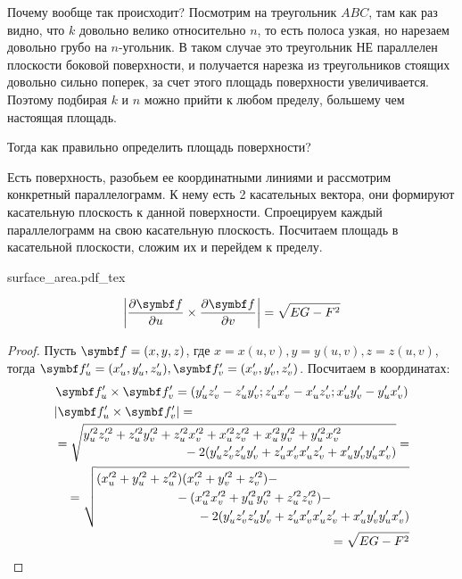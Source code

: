 \documentclass[main]{subfiles}
\begin{document}
\begin{example}
    Почему вообще так происходит?
    Посмотрим на треугольник $ABC$, там как раз видно, что $k$ довольно велико относительно $n$,
    то есть полоса узкая, но нарезаем довольно грубо на $n$-угольник.
    В таком случае это треугольник НЕ параллелен плоскости боковой поверхности,
    и получается нарезка из треугольников стоящих довольно сильно поперек, за счет этого площадь поверхности увеличивается.
    Поэтому подбирая $k$ и $n$ можно прийти к любом пределу, большему чем настоящая площадь.
\end{example}

Тогда как правильно определить площадь поверхности?

\begin{definition}
    Есть поверхность, разобьем ее координатными линиями и рассмотрим конкретный параллелограмм.
    К нему есть 2 касательных вектора, они формируют касательную плоскость к данной поверхности.
    Спроецируем каждый параллелограмм на свою касательную плоскость.
    Посчитаем площадь в касательной плоскости, сложим их и перейдем к пределу.
    \begin{center}
        {surface_area.pdf_tex}
    \end{center}
\end{definition}
\begin{theorem}
    \[\left| \frac{\partial \vf}{\partial u} \times \frac{\partial \vf}{\partial v}\right| = \sqrt{EG - F^2}\]
\end{theorem}
\begin{proof}
    Пусть $\vf = (x,y,z)$, где $x=x(u,v), y = y(u,v), z = z(u,v)$, тогда $\vf'_u = (x'_u, y'_u, z'_u), \vf'_v = (x'_v, y'_v, z'_v)$.
    Посчитаем в координатах:
    \begin{gather*}
        \vf'_u \times \vf'_v = (y'_u z'_v - z'_u y'_v; z'_u x'_v - x'_u z'_v; x'_u y'_v - y'_u x'_v)\\
        \begin{multlined}
            |\vf'_u \times \vf'_v| = \\
            =\sqrt{
                \begin{multlined}
                    y'^2_u z'^2_v + z'^2_u y'^2_v + z'^2_u x'^2_v + x'^2_u z'^2_v + x'^2_u y'^2_v + y'^2_u x'^2_v\\
                    -2 (y'_u z'_v z'_u y'_v + z'_u x'_v x'_u z'_v + x'_u y'_v y'_u x'_v )
                \end{multlined}
            } = \\
            =\sqrt{
                \begin{multlined}
                    (x'^2_u + y'^2_u +z'^2_u)(x'^2_v + y'^2_v + z'^2_v) - \\
                    - (x'^2_u x'^2_v + y'^2_u y'^2_v + z'^2_u z'^2_v) - \\
                    -2 (y'_u z'_v z'_u y'_v + z'_u x'_v x'_u z'_v + x'_u y'_v y'_u x'_v )
                \end{multlined}
            }  \\
            =\sqrt{EG-F^2}
        \end{multlined}
    \end{gather*}
\end{proof}
\end{document}

